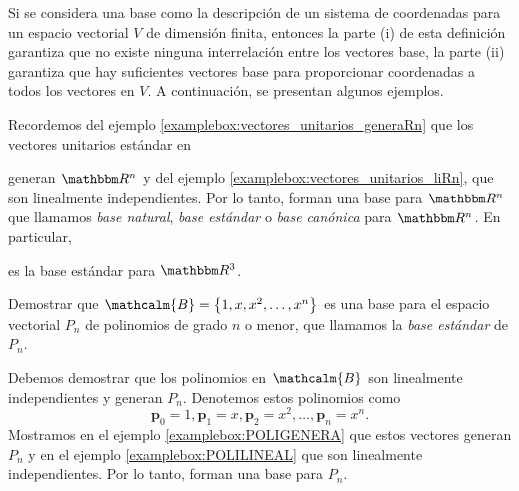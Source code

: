 Si se considera una base como la descripción de un sistema de coordenadas para un espacio vectorial $V$ de dimensión finita, entonces la parte (i) de esta definición garantiza que no existe ninguna interrelación entre los vectores base, la parte (ii) garantiza que hay suficientes vectores base para proporcionar coordenadas a todos los vectores en $V$. A continuación, se presentan algunos ejemplos.

\begin{examplebox}{}{}
    Recordemos del ejemplo \ref{examplebox:vectores_unitarios_generaRn} que los vectores unitarios estándar en
    \begin{matrizn}
    \end{matrizn}
    generan $\RR[n]$ y del ejemplo \ref{examplebox:vectores_unitarios_liRn}, que son linealmente independientes. Por lo tanto, forman una base para $\RR[n]$ que llamamos \emph{base natural}, \emph{base estándar} o \emph{base canónica} para $\RR[n]$. En particular,
    \begin{matrizn}
    \end{matrizn}
    es la base estándar para $\RR[3]$.
\end{examplebox}

\newpage

\begin{examplebox}{}{}
    Demostrar que $\mathcalm{B} = \left\{1, x, x^2, \dots, x^n\right\}$ es una base para el espacio vectorial $P_n$ de polinomios de grado $n$ o menor, que llamamos la \emph{base estándar} de $P_n$.
    
    \tcblower
    \solucion Debemos demostrar que los polinomios en $\mathcalm{B}$ son linealmente independientes y generan $P_n$. Denotemos estos polinomios como
    $$\mathbf{p}_0 = 1, \mathbf{p}_1 = x, \mathbf{p}_2 = x^2, \dots, \mathbf{p}_n = x^n.$$
    Mostramos en el ejemplo \ref{examplebox:POLIGENERA} que estos vectores generan $P_n$ y en el ejemplo \ref{examplebox:POLILINEAL} que son linealmente independientes. Por lo tanto, forman una base para $P_n$.
\end{examplebox}

